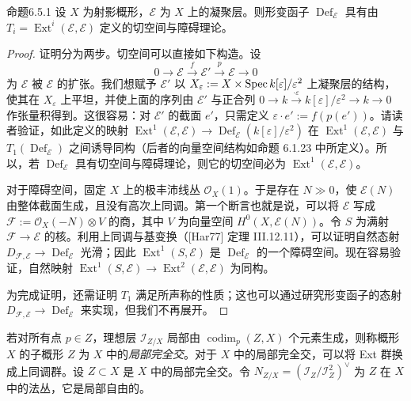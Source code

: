 \begin{origstatement}{命题}{6.5.1}\label{ch06:6.5.1}
设 $X$ 为射影概形，$\mathcal E$ 为 $X$ 上的凝聚层。则形变函子 $\operatorname{Def}_{\mathcal E}$ 具有由 $T_i=\operatorname{Ext}^i(\mathcal E,\mathcal E)$ 定义的切空间与障碍理论。
\end{origstatement}
\begin{proof}
证明分为两步。切空间可以直接如下构造。设
\[
0\longrightarrow\mathcal E\xrightarrow{f}\mathcal E'
\xrightarrow{p}\mathcal E\longrightarrow0
\]
为 $\mathcal E$ 被 $\mathcal E$ 的扩张。我们想赋予 $\mathcal E'$ 以 $X_\varepsilon:=X\times\operatorname{Spec} k[\varepsilon]/\varepsilon^2$ 上凝聚层的结构，使其在 $X_\varepsilon$ 上平坦，并使上面的序列由 $\mathcal E'$ 与正合列 $0\to k\xrightarrow{\cdot\varepsilon}k[\varepsilon]/\varepsilon^2\to k\to0$ 作张量积得到。这很容易：对 $\mathcal E'$ 的截面 $e'$，只需定义 $\varepsilon\cdot e':=f(p(e'))$。请读者验证，如此定义的映射 $\operatorname{Ext}^1(\mathcal E,\mathcal E)\to\operatorname{Def}_{\mathcal E}(k[\varepsilon]/\varepsilon^2)$ 在 $\operatorname{Ext}^1(\mathcal E,\mathcal E)$ 与 $T_1(\operatorname{Def}_{\mathcal E})$ 之间诱导同构（后者的向量空间结构如命题 6.1.23 中所定义）。所以，若 $\operatorname{Def}_{\mathcal E}$ 具有切空间与障碍理论，则它的切空间必为 $\operatorname{Ext}^1(\mathcal E,\mathcal E)$。

对于障碍空间，固定 $X$ 上的极丰沛线丛 $\mathcal O_X(1)$。于是存在 $N\gg0$，使 $\mathcal E(N)$ 由整体截面生成，且没有高次上同调。第一个断言也就是说，可以将 $\mathcal E$ 写成 $\mathcal F:=\mathcal O_X(-N)\otimes V$ 的商，其中 $V$ 为向量空间 $H^0(X,\mathcal E(N))$。令 $S$ 为满射 $\mathcal F\to\mathcal E$ 的核。利用上同调与基变换（[Har77] 定理 III.12.11），可以证明自然态射 $D_{\mathcal F,\mathcal E}\to\operatorname{Def}_{\mathcal E}$ 光滑；因此 $\operatorname{Ext}^1(S,\mathcal E)$ 是 $\operatorname{Def}_{\mathcal E}$ 的一个障碍空间。现在容易验证，自然映射 $\operatorname{Ext}^1(S,\mathcal E)\to\operatorname{Ext}^2(\mathcal E,\mathcal E)$ 为同构。

为完成证明，还需证明 $T_1$ 满足所声称的性质；这也可以通过研究形变函子的态射 $D_{\mathcal F,\mathcal E}\to\operatorname{Def}_{\mathcal E}$ 来实现，但我们不再展开。
\end{proof}
若对所有点 $p\in Z$，理想层 $\mathcal I_{Z/X}$ 局部由 $\operatorname{codim}_p(Z,X)$ 个元素生成，则称概形 $X$ 的子概形 $Z$ 为 $X$ 中的\emph{局部完全交}。对于 $X$ 中的局部完全交，可以将 Ext 群换成上同调群。设 $Z\subset X$ 是 $X$ 中的局部完全交。令 $N_{Z/X}=(\mathcal I_Z/\mathcal I_Z^2)^\vee$ 为 $Z$ 在 $X$ 中的法丛，它是局部自由的。

